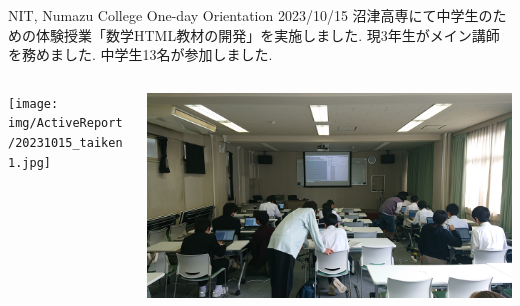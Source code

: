 \documentclass[dvipdfmx, unicode]{beamer}
\begin{document}
\begin{frame}[t]{NIT, Numazu College One-day Orientation 2023/10/15}
  沼津高専にて中学生のための体験授業「数学HTML教材の開発」を実施しました.
  現3年生がメイン講師を務めました.
  中学生13名が参加しました.
  \begin{columns}[T]
    \begin{column}{0.5\linewidth}
      \texttt{[image: img/ActiveReport/20231015\_taiken1.jpg]}
    \end{column}
    \begin{column}{0.5\linewidth}
      \includegraphics[width=\linewidth]{img/ActiveReport/20231015_taiken2.jpg}
    \end{column}
  \end{columns}
\end{frame}
\end{document}
